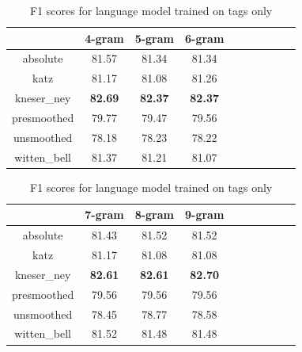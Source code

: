 \documentclass[11pt,a4paper]{article}
\begin{document}
\begin{table}[ht]
\centering
\begin{tabular}{|c|c|c|c|c|c|c|c|c|c|}
\hline
              & 4-gram & 5-gram & 6-gram  \\ \hline
absolute     & 81.57  & 81.34  & 81.34   \\ \hline
katz           & 81.17  & 81.08  & 81.26    \\ \hline
kneser\_ney    & \textbf{82.69} &\textbf{82.37}  & \textbf{82.37}    \\ \hline
presmoothed  & 79.77  & 79.47  & 79.56   \\ \hline
unsmoothed     & 78.18  & 78.23  & 78.22   \\ \hline
witten\_bell & 81.37  & 81.21  & 81.07   \\ \hline
\end{tabular}
\caption{F1 scores for language model trained on tags only}
\label{f1-o-scores-2}
\end{table}
\begin{table}[ht]
\centering
\begin{tabular}{|c|c|c|c|c|c|c|c|c|c|}
\hline
              & 7-gram & 8-gram & 9-gram \\ \hline
absolute      & 81.43  & 81.52  & 81.52  \\ \hline
katz         & 81.17  & 81.08  & 81.08  \\ \hline
kneser\_ney  & \textbf{82.61}  & \textbf{82.61}  & \textbf{82.70}  \\ \hline
presmoothed  & 79.56  & 79.56  & 79.56  \\ \hline
unsmoothed   & 78.45  & 78.77  & 78.58  \\ \hline
witten\_bell & 81.52  & 81.48  & 81.48  \\ \hline
\end{tabular}
\caption{F1 scores for language model trained on tags only}
\label{f1-o-scores-3}
\end{table}
\end{document}
